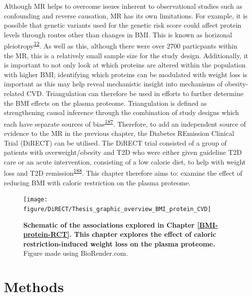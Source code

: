 \documentclass[11pt,twoside]{bristolthesis}
\begin{document}
Although MR helps to overcome issues inherent to observational studies such as confounding and reverse causation, MR has its own limitations. For example, it is possible that genetic variants used for the genetic risk score could affect protein levels through routes other than changes in BMI. This is known as horizonal pleiotropy\textsuperscript{\protect\hyperlink{ref-Davies2018}{12}}. As well as this, although there were over 2700 particpants within the MR, this is a relatively small sample size for the study design. Additionally, it is important to not only look at which proteins are altered within the population with higher BMI; identifying which proteins can be modulated with weight loss is important as this may help reveal mechanistic insight into mechanisms of obesity-related CVD. Triangulation can therefore be used in efforts to further determine the BMI effects on the plasma proteome. Triangulation is defined as strengthening causal inference through the combination of study designs which each have separate sources of bias\textsuperscript{\protect\hyperlink{ref-Lawlor2016}{187}}. Therefore, to add an independent source of evidence to the MR in the previous chapter, the Diabetes REmission Clinical Trial (DiRECT) can be utilised. The DiRECT trial consisted of a group of patients with overweight/obesity and T2D who were either given guideline T2D care or an acute intervention, consisting of a low calorie diet, to help with weight loss and T2D remission\textsuperscript{\protect\hyperlink{ref-Lean2018}{188}}. This chapter therefore aims to: examine the effect of reducing BMI with caloric restriction on the plasma proteome.



\begin{figure}

{\centering \texttt{[image: figure/DiRECT/Thesis\_graphic\_overview\_BMI\_protein\_CVD]} 

}

\caption[Schematic of the associations explored in Chapter \ref{BMI-protein-RCT}]{\textbf{Schematic of the associations explored in Chapter \ref{BMI-protein-RCT}. This chapter explores the effect of caloric restriction-induced weight loss on the plasma proteome.} Figure made using BioRender.com.}\label{fig:BMI-protein-graphic2}
\end{figure}
\hypertarget{methods-3}{%
\section{Methods}\label{methods-3}}
\end{document}
